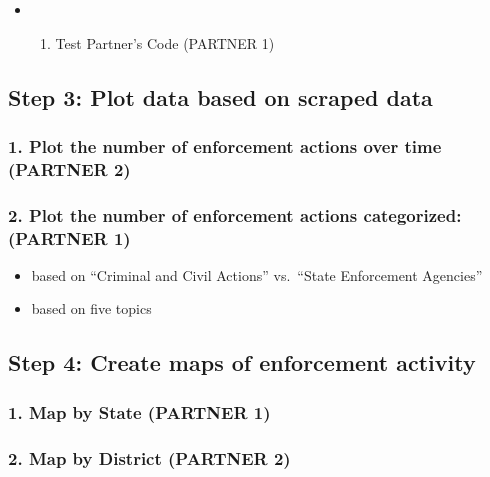 \documentclass[
  letterpaper,
  DIV=11,
  numbers=noendperiod]{scrartcl}
\providecommand{\tightlist}{%
  \setlength{\itemsep}{0pt}\setlength{\parskip}{0pt}}\usepackage{longtable,booktabs,array}
\begin{document}
\begin{itemize}
\tightlist
\item
  \begin{enumerate}
  \def\labelenumi{\alph{enumi}.}
  \setcounter{enumi}{2}
  \tightlist
  \item
    Test Partner's Code (PARTNER 1)
  \end{enumerate}
\end{itemize}

\subsection{Step 3: Plot data based on scraped
data}\label{step-3-plot-data-based-on-scraped-data}

\subsubsection{1. Plot the number of enforcement actions over time
(PARTNER
2)}\label{plot-the-number-of-enforcement-actions-over-time-partner-2}

\subsubsection{2. Plot the number of enforcement actions categorized:
(PARTNER
1)}\label{plot-the-number-of-enforcement-actions-categorized-partner-1}

\begin{itemize}
\item
  based on ``Criminal and Civil Actions'' vs.~``State Enforcement
  Agencies''
\item
  based on five topics
\end{itemize}

\subsection{Step 4: Create maps of enforcement
activity}\label{step-4-create-maps-of-enforcement-activity}

\subsubsection{1. Map by State (PARTNER
1)}\label{map-by-state-partner-1}

\subsubsection{2. Map by District (PARTNER
2)}\label{map-by-district-partner-2}
\end{document}
